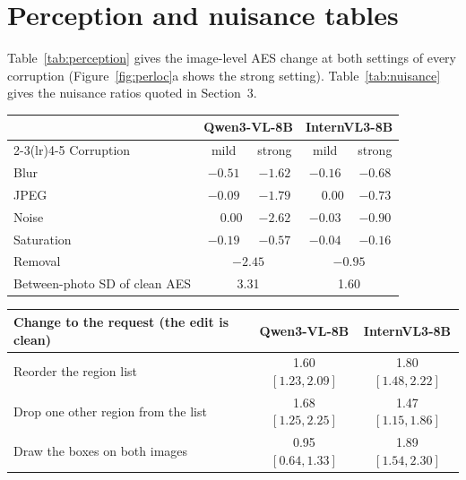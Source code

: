 \documentclass[10pt,a4paper]{article}
\begin{document}
\clearpage
\section{Perception and nuisance tables}
\label{app:tables}

Table~\ref{tab:perception} gives the image-level AES change at both settings of every corruption (Figure~\ref{fig:perloc}a shows the strong setting). Table~\ref{tab:nuisance} gives the nuisance ratios quoted in Section~3.

\begin{center}
\centering
\small
\begin{tabular}{lcccc}
\toprule
 & \multicolumn{2}{c}{Qwen3-VL-8B} & \multicolumn{2}{c}{InternVL3-8B} \\
\cmidrule(lr){2-3}\cmidrule(lr){4-5}
Corruption & mild & strong & mild & strong \\
\midrule
Blur       & $-0.51$ & $-1.62$ & $-0.16$ & $-0.68$ \\
JPEG       & $-0.09$ & $-1.79$ & $\phantom{-}0.00$ & $-0.73$ \\
Noise      & $\phantom{-}0.00$ & $-2.62$ & $-0.03$ & $-0.90$ \\
Saturation & $-0.19$ & $-0.57$ & $-0.04$ & $-0.16$ \\
Removal    & \multicolumn{2}{c}{$-2.45$} & \multicolumn{2}{c}{$-0.95$} \\
\midrule
Between-photo SD of clean AES & \multicolumn{2}{c}{3.31} & \multicolumn{2}{c}{1.60} \\
\bottomrule
\end{tabular}
\label{tab:perception}
\end{center}

\begin{center}
\centering
\small
\begin{tabular}{lcc}
\toprule
Change to the request (the edit is clean) & Qwen3-VL-8B & InternVL3-8B \\
\midrule
Reorder the region list        & 1.60 $[1.23, 2.09]$ & 1.80 $[1.48, 2.22]$ \\
Drop one other region from the list & 1.68 $[1.25, 2.25]$ & 1.47 $[1.15, 1.86]$ \\
Draw the boxes on both images   & 0.95 $[0.64, 1.33]$ & 1.89 $[1.54, 2.30]$ \\
\bottomrule
\end{tabular}
\label{tab:nuisance}
\end{center}
\end{document}
